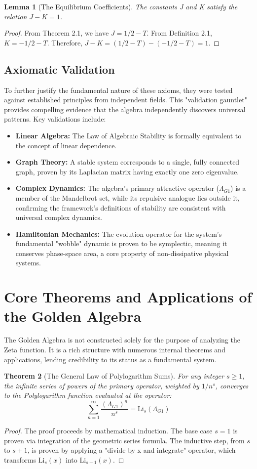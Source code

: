 \documentclass{article}
\theoremstyle{plain}
\newtheorem{theorem}{Theorem}[section]
\newtheorem{lemma}[theorem]{Lemma}
\theoremstyle{definition}
\theoremstyle{remark}
\begin{document}
\begin{lemma}[The Equilibrium Coefficients]
The constants J and K satisfy the relation $J-K=1$.
\end{lemma}
\begin{proof}
From Theorem 2.1, we have $J = 1/2 - T$. From Definition 2.1, $K = -1/2 - T$.
Therefore, $J-K = (1/2 - T) - (-1/2 - T) = 1$.
\end{proof}

\subsection{Axiomatic Validation}
To further justify the fundamental nature of these axioms, they were tested against established principles from independent fields. This "validation gauntlet" provides compelling evidence that the algebra independently discovers universal patterns. Key validations include:
\begin{itemize}
    \item \textbf{Linear Algebra:} The Law of Algebraic Stability is formally equivalent to the concept of linear dependence.
    \item \textbf{Graph Theory:} A stable system corresponds to a single, fully connected graph, proven by its Laplacian matrix having exactly one zero eigenvalue.
    \item \textbf{Complex Dynamics:} The algebra's primary attractive operator ($\Lambda_{G1}$) is a member of the Mandelbrot set, while its repulsive analogue lies outside it, confirming the framework's definitions of stability are consistent with universal complex dynamics.
    \item \textbf{Hamiltonian Mechanics:} The evolution operator for the system's fundamental "wobble" dynamic is proven to be symplectic, meaning it conserves phase-space area, a core property of non-dissipative physical systems.
\end{itemize}

\section{Core Theorems and Applications of the Golden Algebra}
The Golden Algebra is not constructed solely for the purpose of analyzing the Zeta function. It is a rich structure with numerous internal theorems and applications, lending credibility to its status as a fundamental system.

\begin{theorem}[The General Law of Polylogarithm Sums]
For any integer $s \ge 1$, the infinite series of powers of the primary operator, weighted by $1/n^s$, converges to the Polylogarithm function evaluated at the operator:
$$\sum_{n=1}^{\infty} \frac{(\Lambda_{G1})^n}{n^s} = \mathrm{Li}_s(\Lambda_{G1})$$
\end{theorem}
\begin{proof}
The proof proceeds by mathematical induction. The base case $s=1$ is proven via integration of the geometric series formula. The inductive step, from $s$ to $s+1$, is proven by applying a "divide by x and integrate" operator, which transforms $\mathrm{Li}_s(x)$ into $\mathrm{Li}_{s+1}(x)$.
\end{proof}
\end{document}
